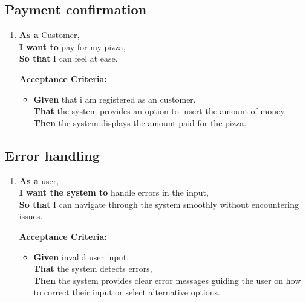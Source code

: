 \subsection{Payment confirmation}
\begin{enumerate}[resume, label= \textbf{User Story \arabic*:}]
    \item \textbf{As a} Customer,\\
    \textbf{I want to} pay for my pizza,\\
    \textbf{So that} I can feel at ease.
    
    \textbf{Acceptance Criteria:}
    \begin{itemize}
        \item \textbf{Given} that i am registered as an customer,\\
        \textbf{That} the system provides an option to insert the amount of money,\\
        \textbf{Then} the system displays the amount paid for the pizza.
    \end{itemize}
\end{enumerate}


\subsection{Error handling}

\begin{enumerate}[resume, label= \textbf{User Story \arabic*:}]
    \item \textbf{As a} user,\\
    \textbf{I want the system to} handle errors in the input,\\
    \textbf{So that} I can navigate through the system smoothly without encountering issues.
    
    \textbf{Acceptance Criteria:}
    \begin{itemize}
        \item \textbf{Given} invalid user input,\\
        \textbf{That} the system detects errors,\\
        \textbf{Then} the system provides clear error messages guiding the user on how to correct their input or select alternative options.
    \end{itemize}
\end{enumerate}